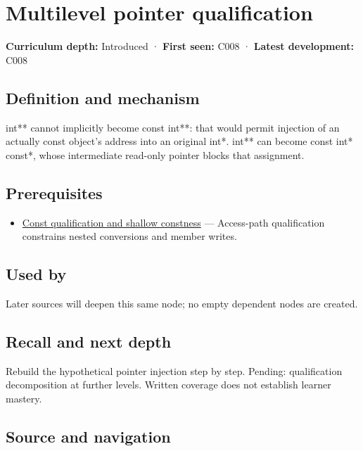 \hypertarget{appendix-5e1a7561cd98}{}
\section{Multilevel pointer qualification}\label{appendix-5e1a7561cd98-multilevel-pointer-qualification}

\textbf{Curriculum depth:} Introduced · \textbf{First seen:} C008 · \textbf{Latest development:} C008

\subsection{Definition and mechanism}\label{appendix-5e1a7561cd98-definition-and-mechanism}

int** cannot implicitly become const int**: that would permit injection of an actually const object's address into an original int*. int** can become const int* const*, whose intermediate read-only pointer blocks that assignment.

\subsection{Prerequisites}\label{appendix-5e1a7561cd98-prerequisites}

\begin{itemize}
\tightlist
\item
  \hyperref[appendix-c25d60fed375]{Const qualification and shallow constness} --- Access-path qualification constrains nested conversions and member writes.
\end{itemize}

\subsection{Used by}\label{appendix-5e1a7561cd98-used-by}

Later sources will deepen this same node; no empty dependent nodes are created.

\subsection{Recall and next depth}\label{appendix-5e1a7561cd98-recall-and-next-depth}

Rebuild the hypothetical pointer injection step by step. Pending: qualification decomposition at further levels. Written coverage does not establish learner mastery.

\subsection{Source and navigation}\label{appendix-5e1a7561cd98-source-and-navigation}


